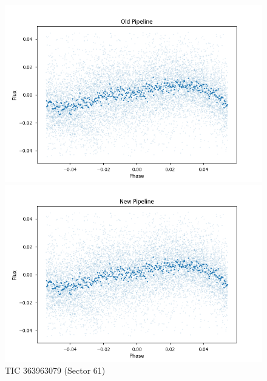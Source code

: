 \documentclass{article}
\begin{document}
\begin{figure}[h!]
    \centering
    \begin{minipage}{0.45\textwidth}
        \centering
        \includegraphics[width=\textwidth]{./figures/2_old.png}
    \end{minipage}%
    \hfill
    \begin{minipage}{0.45\textwidth}
        \centering
        \includegraphics[width=\textwidth]{./figures/2_new.png}
    \end{minipage}
    \caption{TIC 363963079 (Sector 61)}
\end{figure}
\end{document}

